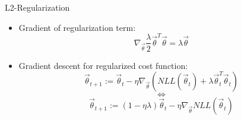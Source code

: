 
\begin{vbframe}{L2-Regularization}

\vfill

\begin{itemize}

\item Gradient of regularization term:
$$\nabla_{\vec\theta} \frac{\lambda}{2}\vec{\theta}^T \vec{\theta} = \lambda \vec{\theta} $$
\item Gradient descent for regularized cost function:
$$\vec \theta_{t+1} := \vec \theta_t - \eta \nabla_{\vec\theta}( NLL(\vec\theta_t) + \lambda\vec{\theta}_t^T \vec{\theta}_t)$$
$$\Leftrightarrow$$
$$\vec \theta_{t+1} := (1 - \eta \lambda) \vec \theta_t - \eta \nabla_{\vec\theta}NLL(\vec\theta_t)$$
\end{itemize}

\vfill

\end{vbframe}


\endlecture

